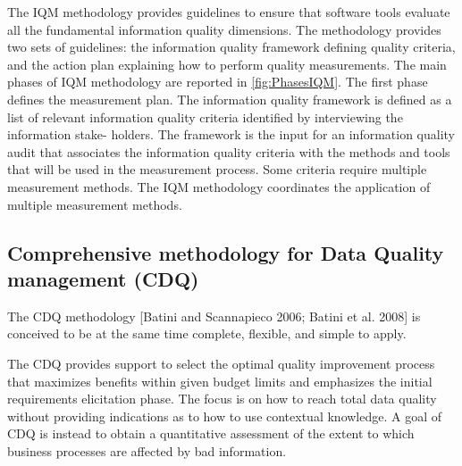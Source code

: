 \documentclass[pdftex,english,oribibl]{llncs}
\begin{document}
The IQM methodology provides guidelines to ensure that software tools evaluate all the fundamental information quality dimensions.
The methodology provides two sets of guidelines: the information quality framework defining quality criteria, and the action plan explaining how to perform quality measurements.
The main phases of IQM methodology are reported in \ref{fig:PhasesIQM}. The first phase defines the measurement plan.
The information quality framework is defined as a list of relevant information quality criteria identified by interviewing the information stake- holders.
The framework is the input for an information quality audit that associates the information quality criteria with the methods and tools that will be used in the measurement process.
Some criteria require multiple measurement methods. The IQM methodology coordinates the application of multiple measurement methods.

\subsection{Comprehensive methodology for Data Quality management (CDQ)}

The CDQ methodology [Batini and Scannapieco 2006; Batini et al. 2008] is conceived to be at the same time complete, flexible, and simple to apply.

\begin{comment}
Completeness is achieved by considering existing techniques and tools and integrating them in a framework that can work in both intra- and inter-organizational contexts, and can be applied to all types of data, structured, semistructured and unstructured.
The methodology is flexible since it supports the user in the selection of the most suitable techniques and tools within each phase and in any context.
Finally, CDQ is simple since it is organized in phases and each phase is characterized by a specific goal and set of techniques to apply.

In fact, the other methodologies implicitly assume that contextual knowledge has been previously gathered and modelled.
\end{comment}

The CDQ provides support to select the optimal quality improvement process that maximizes benefits within given budget limits and emphasizes the initial requirements elicitation phase.
The focus is on how to reach total data quality without providing indications as to how to use contextual knowledge. A goal of CDQ is instead to obtain a quantitative assessment of the extent to which business processes are affected by bad information.
\end{document}

